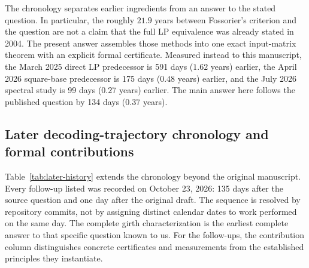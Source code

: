 \documentclass[11pt]{article}
\theoremstyle{definition}
\theoremstyle{remark}
\begin{document}
The chronology separates earlier ingredients from an answer to the stated
question. In particular, the roughly $21.9$ years between Fossorier's
criterion and the question are not a claim that the full LP equivalence
was already stated in 2004. The present answer assembles those methods
into one exact input-matrix theorem with an explicit formal certificate.
Measured instead to this manuscript, the March 2025 direct LP predecessor
is 591 days ($1.62$ years) earlier, the April 2026 square-base predecessor
is 175 days ($0.48$ years) earlier, and the July 2026 spectral study is
99 days ($0.27$ years) earlier. The main answer here follows the published
question by 134 days ($0.37$ years).

\subsection{Later decoding-trajectory chronology and formal contributions}

Table~\ref{tab:later-history} extends the chronology beyond the original
manuscript. Every follow-up listed was recorded on October 23, 2026:
135 days after the source question and one day after the original draft.
The sequence is resolved by repository commits, not by assigning distinct
calendar dates to work performed on the same day. The complete girth
characterization is the earliest complete answer to that specific question
known to us. For the follow-ups, the contribution column distinguishes
concrete certificates and measurements from the established principles
they instantiate.
\end{document}
